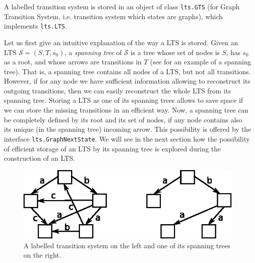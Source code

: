 A labelled transition system is stored in an object of class {\tt lts.GTS}
(for Graph Transition System, i.e. transition system which states are
graphs), which implements {\tt lts.LTS}.

Let us first give an intuitive explanation of the way a LTS is stored.
Given an LTS $\mathcal S = (S, T, s_0)$, a {\em spanning tree} of $\mathcal
S$ is a tree whose set of nodes is $S$, has $s_0$ as a root, and whose
arrows are transitions in $T$ (see  for an example of a
spanning tree). That is, a spanning tree contains all nodes of a LTS, but
not all transitions. However, if for any node we have sufficient
information allowing to reconstruct its outgoing transitions, then we can
easily reconstruct the whole LTS from its spanning tree. Storing a LTS as
one of its spanning trees allows to save space if we can store the missing
transitions in an efficient way. Now, a spanning tree can be completely
defined by its root and its set of nodes, if any node contains also its
unique (in the spanning tree) incoming arrow. This possibility is offered
by the interface {\tt lts.GraphNextState}.  We will see in the next section
how the possibility of efficient storage of an LTS by its spanning tree is
explored during the construction of an LTS.

\begin{figure}[ht]
  \centering
  \includegraphics{fig/spanning-tree}
  \caption{A labelled transition system on the left and one of its spanning trees on the right.}
\end{figure}


